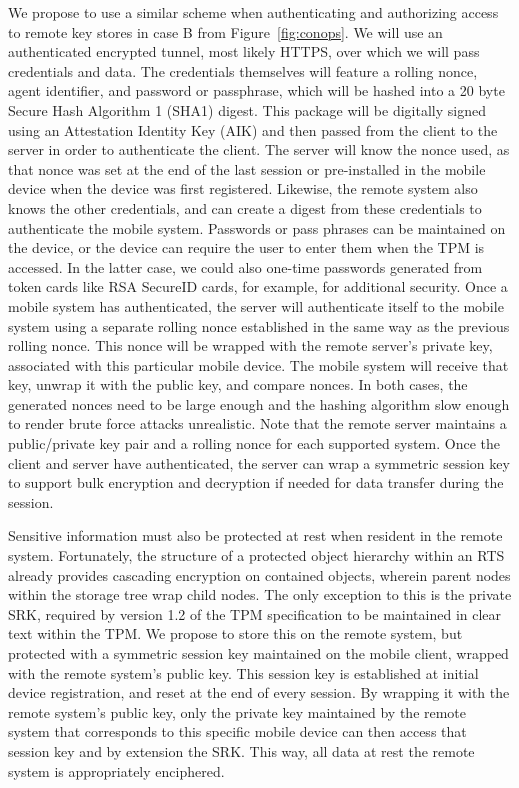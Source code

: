 \documentclass[10pt,letterpaper]{article}
\begin{document}
We propose to use a similar scheme when authenticating and authorizing access to remote key stores in case B from Figure~\ref{fig:conops}.  We will use an authenticated encrypted tunnel, most likely HTTPS, over which we will pass credentials and data.  The credentials themselves will feature a rolling nonce, agent identifier, and password or passphrase, which will be hashed into a 20 byte Secure Hash Algorithm 1 (SHA1) digest.  This package will be digitally signed using an Attestation Identity Key (AIK) and then passed from the client to the server in order to authenticate the client.  The server will know the nonce used, as that nonce was set at the end of the last session or pre-installed in the mobile device when the device was first registered.  Likewise, the remote system also knows the other credentials, and can create a digest from these credentials to authenticate the mobile system.  Passwords or pass phrases can be maintained on the device, or the device can require the user to enter them when the TPM is accessed.  In the latter case, we could also one-time passwords generated from token cards like RSA SecureID cards, for example, for additional security.  Once a mobile system has authenticated, the server will authenticate itself to the mobile system using a separate rolling nonce established in the same way as the previous rolling nonce.  This nonce will be wrapped with the remote server's private key, associated with this particular mobile device.  The mobile system will receive that key, unwrap it with the public key, and compare nonces.  In both cases, the generated nonces need to be large enough and the hashing algorithm slow enough to render brute force attacks unrealistic.  Note that the remote server maintains a public/private key pair and a rolling nonce for each supported system.  Once the client and server have authenticated, the server can wrap a symmetric session key to support bulk encryption and decryption if needed for data transfer during the session.

Sensitive information must also be protected at rest when resident in the remote system.  Fortunately, the structure of a protected object hierarchy within an RTS already provides cascading encryption on contained objects, wherein parent nodes within the storage tree wrap child nodes.  The only exception to this is the private SRK, required by version 1.2 of the TPM specification to be maintained in clear text within the TPM.  We propose to store this on the remote system, but protected with a symmetric session key maintained on the mobile client, wrapped with the remote system's public key.  This session key is established at initial device registration, and reset at the end of every session.  By wrapping it with the remote system's public key, only the private key maintained by the remote system that corresponds to this specific mobile device can then access that session key and by extension the SRK.  This way, all data at rest the remote system is appropriately enciphered.  
\end{document}
